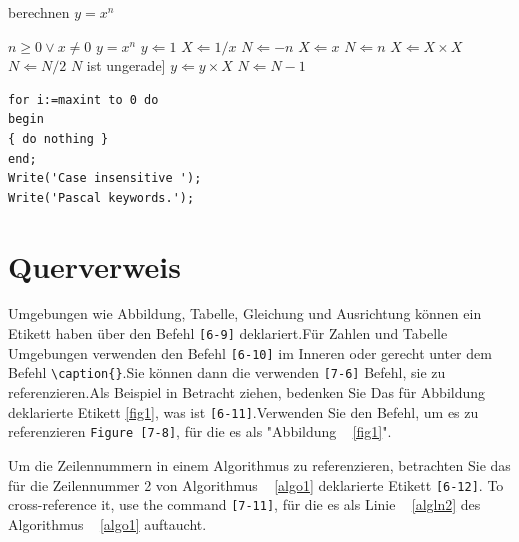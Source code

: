 \documentclass[pdflatex,sn-mathphys-num]{sn-jnl}%
\theoremstyle{thmstyleone}%
\theoremstyle{thmstyletwo}%
\theoremstyle{thmstylethree}%
\begin{document}
\begin{algorithm}
\caption{berechnen $y = x^n$} \label{algo1}
\begin{algorithmic}[1]
\Require $n \geq 0 \vee x \neq 0$
\Ensure $y = x^n$
\State $y \Leftarrow 1$
 \label{algln2}
\State $X \Leftarrow 1 / x$
\State $N \Leftarrow -n$
\Else
\State $X \Leftarrow x$
\State $N \Leftarrow n$
\EndIf
{}
\State $X \Leftarrow X \times X$
\State $N \Leftarrow N / 2$
\Else $N$ ist ungerade]
\State $y \Leftarrow y \times X$
\State $N \Leftarrow N - 1$
\EndIf
\EndWhile
\end{algorithmic}
\end{algorithm}

\bigskip
\begin{minipage}{[22-6]} %
\lstset{Frame = einzeln, FramExLeftmargin = -1pt, FramexRightmargin = -17pt, Framesep = 12pt, Linienbreite = 0,98 \textwidth, Sprache = Pascal} %
\begin{lstlisting}
for i:=maxint to 0 do
begin
{ do nothing }
end;
Write('Case insensitive ');
Write('Pascal keywords.');
\end{lstlisting}
\end{minipage}

\section{Querverweis} \label{sec8}

Umgebungen wie Abbildung, Tabelle, Gleichung und Ausrichtung können ein Etikett haben
über den Befehl \verb+[6-9]+ deklariert.Für Zahlen und Tabelle
Umgebungen verwenden den Befehl \verb+[6-10]+ im Inneren oder gerecht
unter dem Befehl \verb+\caption{}+.Sie können dann die verwenden
\verb+[7-6]+ Befehl, sie zu referenzieren.Als Beispiel in Betracht ziehen, bedenken Sie
Das für Abbildung deklarierte Etikett \ref{fig1}, was ist
\verb+[6-11]+.Verwenden Sie den Befehl, um es zu referenzieren
\verb+Figure [7-8]+, für die es als
"Abbildung ~ \ref{fig1}".

Um die Zeilennummern in einem Algorithmus zu referenzieren, betrachten Sie das für die Zeilennummer 2 von Algorithmus ~ \ref{algo1} deklarierte Etikett \verb+[6-12]+. To cross-reference it, use the command \verb+[7-11]+, für die es als Linie ~ \ref{algln2} des Algorithmus ~ \ref{algo1} auftaucht.
\end{document}
